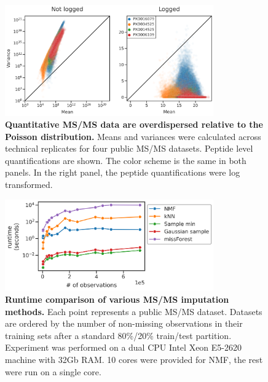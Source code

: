 \documentclass{article}
\begin{document}
\begin{figure}
\centering
\includegraphics[width=0.8\textwidth]{figures/mean-x-var-figure-v3.png}
\caption{{\bf Quantitative MS/MS data are overdispersed relative to the Poisson distribution.} Means and variances were calculated across technical replicates for four public MS/MS datasets. Peptide level quantifications are shown. The color scheme is the same in both panels. In the right panel, the peptide quantifications were log transformed.}
\label{fig:mean-x-var}
\end{figure}

\begin{figure}
\centering
\includegraphics[width=0.8\textwidth]{figures/runtimes-plotted-lineplot-cp.png}
\caption{{\bf Runtime comparison of various MS/MS imputation methods.} Each point represents a public MS/MS dataset. Datasets are ordered by the number of non-missing observations in their training sets after a standard 80\%/20\% train/test partition. Experiment was performed on a dual CPU Intel Xeon E5-2620 machine with 32Gb RAM. 10 cores were provided for NMF, the rest were run on a single core.}
\label{fig:runtime}
\end{figure}

\end{document}
